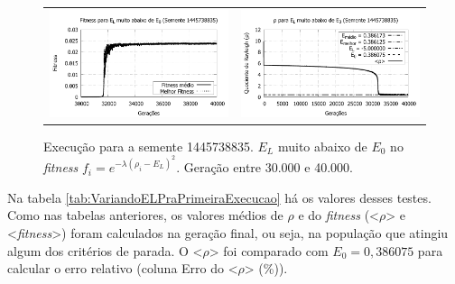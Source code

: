 	\begin{figure}[htbp]
	\centering
  \begin{tabular}{@{}cc@{}}	
		\includegraphics[width=.45\textwidth]{figs/resultados/variandoELSemente/T4_S-1445738835_fitness-extendido.pdf} &
    \includegraphics[width=.45\textwidth]{figs/resultados/variandoELSemente/T4_S-1445738835_rho_extendido.pdf}
  \end{tabular}
  \caption{Execução para a semente 1445738835. $E_L$ muito abaixo de $E_0$ no \textit{fitness} $f_i = e^{-\lambda(\rho_i - E_L)^2}$. Geração entre 30.000 e 40.000.}
	\label{fig:execucoesSemente_EL_umMuitoAbaixo40000}
	\end{figure}
	
	Na tabela \ref{tab:VariandoELPraPrimeiraExecucao} há os valores desses testes. Como nas tabelas anteriores, os valores médios de $\rho$ e do \emph{fitness} (<$\rho$> e <\emph{fitness}>) foram calculados na geração final, ou seja, na população que atingiu algum dos critérios de parada. O <$\rho$> foi comparado com $E_0 = 0,386075$ para calcular o erro relativo (coluna Erro do <$\rho$> (\%)).

